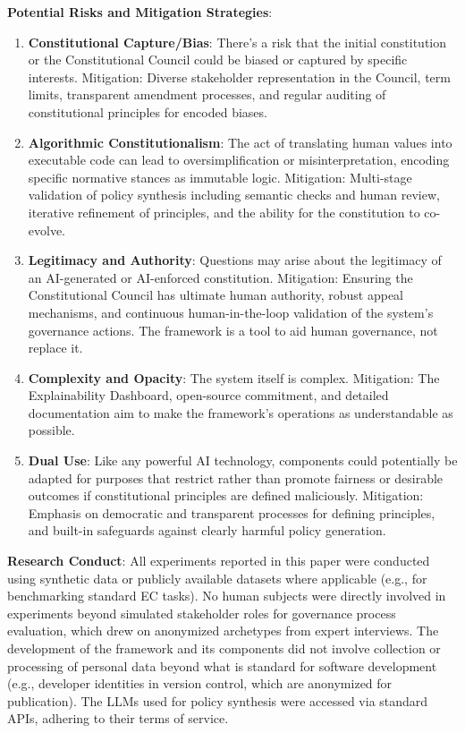\documentclass[manuscript,screen,review,anonymous,9pt]{acmart}
\begin{document}
\textbf{Potential Risks and Mitigation Strategies}:
\begin{enumerate}
	\item \textbf{Constitutional Capture/Bias}: There's a risk that the initial constitution or the Constitutional Council could be biased or captured by specific interests. Mitigation: Diverse stakeholder representation in the Council, term limits, transparent amendment processes, and regular auditing of constitutional principles for encoded biases.
	\item \textbf{Algorithmic Constitutionalism}: The act of translating human values into executable code can lead to oversimplification or misinterpretation, encoding specific normative stances as immutable logic. Mitigation: Multi-stage validation of policy synthesis including semantic checks and human review, iterative refinement of principles, and the ability for the constitution to co-evolve.
	\item \textbf{Legitimacy and Authority}: Questions may arise about the legitimacy of an AI-generated or AI-enforced constitution. Mitigation: Ensuring the Constitutional Council has ultimate human authority, robust appeal mechanisms, and continuous human-in-the-loop validation of the system's governance actions. The framework is a tool to aid human governance, not replace it.
	\item \textbf{Complexity and Opacity}: The system itself is complex. Mitigation: The Explainability Dashboard, open-source commitment, and detailed documentation aim to make the framework's operations as understandable as possible.
	\item \textbf{Dual Use}: Like any powerful AI technology, components could potentially be adapted for purposes that restrict rather than promote fairness or desirable outcomes if constitutional principles are defined maliciously. Mitigation: Emphasis on democratic and transparent processes for defining principles, and built-in safeguards against clearly harmful policy generation.
\end{enumerate}

\textbf{Research Conduct}: All experiments reported in this paper were conducted using synthetic data or publicly available datasets where applicable (e.g., for benchmarking standard EC tasks). No human subjects were directly involved in experiments beyond simulated stakeholder roles for governance process evaluation, which drew on anonymized archetypes from expert interviews. The development of the framework and its components did not involve collection or processing of personal data beyond what is standard for software development (e.g., developer identities in version control, which are anonymized for publication). The LLMs used for policy synthesis were accessed via standard APIs, adhering to their terms of service.
\end{document}
